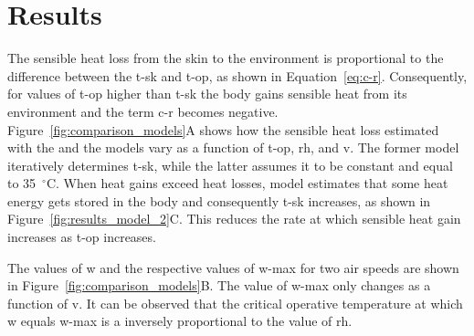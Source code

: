 

\section{Results}\label{sec:results}

The sensible heat loss from the skin to the environment is proportional to the difference between the \ac{t-sk} and \ac{t-op}, as shown in Equation~\ref{eq:c-r}.
Consequently, for values of \ac{t-op} higher than \ac{t-sk} the body gains sensible heat from its environment and the term \ac{c-r} becomes negative.
Figure~\ref{fig:comparison_models}A shows how the sensible heat loss estimated with the  and the  models vary as a function of \ac{t-op}, \ac{rh}, and \ac{v}.
The former model iteratively determines \ac{t-sk}, while the latter assumes it to be constant and equal to 35~$^{\circ}$C\@.
When heat gains exceed heat losses,  model estimates that some heat energy gets stored in the body and consequently \ac{t-sk} increases, as shown in Figure~\ref{fig:results_model_2}C\@.
This reduces the rate at which sensible heat gain increases as \ac{t-op} increases.

The values of \ac{w} and the respective values of \ac{w-max} for two air speeds are shown in Figure~\ref{fig:comparison_models}B\@.
The value of \ac{w-max} only changes as a function of \ac{v}.
It can be observed that the critical operative temperature at which \ac{w} equals \ac{w-max} is a inversely proportional to the value of \ac{rh}.


